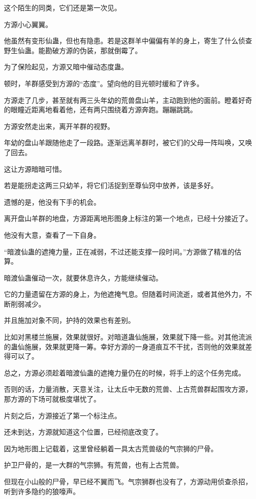 \begin{this_body}
这个陌生的同类，它们还是第一次见。

方源小心翼翼。

他虽然有变形仙蛊，但也有隐患。若是这群羊中偏偏有羊的身上，寄生了什么侦查野生仙蛊。能勘破方源的伪装，那就倒霉了。

为了保险起见，方源又暗中催动态度蛊。

顿时，羊群感受到方源的“态度”。望向他的目光顿时缓和了许多。

方源走了几步，甚至就有两三头年幼的荒兽盘山羊，主动跑到他的面前。瞪着好奇的眼瞳近距离地看着他，还有两只围绕着方源奔跑。蹦蹦跳跳。

方源安然走出来，离开羊群的视野。

年幼的盘山羊跟随他走了一段路。逐渐远离羊群时，被它们的父母一阵叫唤，又唤了回去。

这让方源暗暗可惜。

若是能拐走这两三只幼羊，将它们活捉到至尊仙窍中放养，该是多好。

遗憾的是，他没有下手的机会。

离开盘山羊群的地盘，方源距离地形图身上标注的第一个地点，已经十分接近了。

他没有大意，查看了一下自身。

“暗渡仙蛊的遮掩力量，正在减弱，不过还能支撑一段时间。”方源做了精准的估算。

暗渡仙蛊催动一次，就要休息许久，方能继续催动。

它的力量遗留在方源的身上，为他遮掩气息。但随着时间流逝，或者其他外力，不断削弱减少。

并且施加对象不同，护持的效果也有差别。

比如对黑楼兰施展，效果就很好。对暗道蛊仙施展，效果就下降一些。对其他流派的蛊仙施展，效果就更降一筹。幸好方源的一身道痕互不干扰，否则他的效果就差得可以了。

总之，方源必须趁着暗渡仙蛊的遮掩力量仍在的时候，将手上的这个任务完成。

否则的话，力量消散，天意关注，让太丘中无数的荒兽、上古荒兽群起围攻方源，那方源的下场可就极度堪忧了。

片刻之后，方源接近了第一个标注点。

还未到达，方源就知道这个位置，已经彻底改变了。

因为地形图上记载着，这里曾经躺着一具太古荒兽级的气宗狮的尸骨。

护卫尸骨的，是一大群的气宗狮。有荒兽，也有上古荒兽。

但现在小山般的尸骨，早已经不翼而飞。气宗狮群也没有了，方源动用侦查杀招，听到许多隐约的狼嚎声。


\end{this_body}
